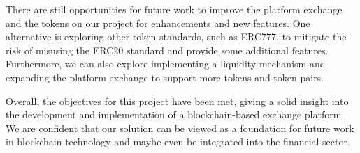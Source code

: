 There are still opportunities for future work to improve the platform exchange and the tokens on our project for enhancements and
new features. One alternative is exploring other token standards, such as ERC777, to mitigate the risk of misusing
the ERC20 standard and provide some additional features. Furthermore, we can also explore implementing a liquidity mechanism
and expanding the platform exchange to support more tokens and token pairs.


Overall, the objectives for this project have been met, giving a solid insight into the development and implementation
of a blockchain-based exchange platform. We are confident that our solution can be viewed as a foundation for
future work in blockchain technology and maybe even be integrated into the financial sector.
